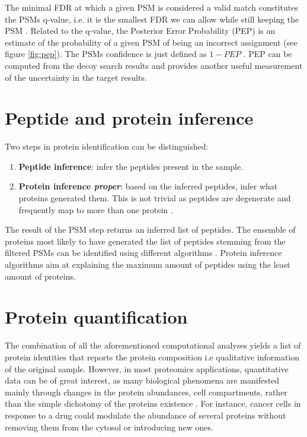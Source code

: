 The minimal FDR at which a given PSM is considered a valid match constitutes the PSM\textquotesingle s q-value, i.e. it is the smallest FDR we can allow while still keeping the PSM \cite{Nesvizhskii2010}. Related to the q-value, the Posterior Error Probability (PEP) is an estimate of the probability of a given PSM of being an incorrect assignment (see figure \ref{fig:pep}). The PSM\textquotesingle s confidence is just defined as $1-PEP$ \cite{Nesvizhskii2010}. PEP can be computed from the decoy search results and provides another useful measurement of the uncertainty in the target results.




\section{Peptide and protein inference}
\label{sec:inference}

Two steps in protein identification can be distinguished:

\begin{enumerate}

\item \textbf{Peptide inference}: infer the peptides present in the sample.
\item \textbf{Protein inference \textit{proper}}: based on the inferred peptides, infer what proteins generated them. This is not trivial as peptides are degenerate and frequently map to more than one protein \cite{Li2012}.
\end{enumerate}

The result of the PSM step returns an inferred list of peptides. The ensemble of proteins most likely to have generated the list of peptides stemming from the filtered PSMs can be identified using different algorithms \cite{Li2012} \cite{Huang2012}. Protein inference algorithms aim at explaining the maximum amount of peptides using the least amount of proteins.

\section{Protein quantification}
\label{sec:quantification}

The combination of all the aforementioned computational analyses yields a list of protein identities that reports the protein composition i.e qualitative information of the original sample. However, in most proteomics applications, quantitative data can be of great interest, as many biological phenomena are manifested mainly through changes in the protein abundances, cell compartments, rather than the simple dichotomy of the protein\textquotesingle s existence \cite{Barsnes2008}. For instance, cancer cells in response to a drug could modulate the abundance of several proteins without removing them from the cytosol or introducing new ones.

